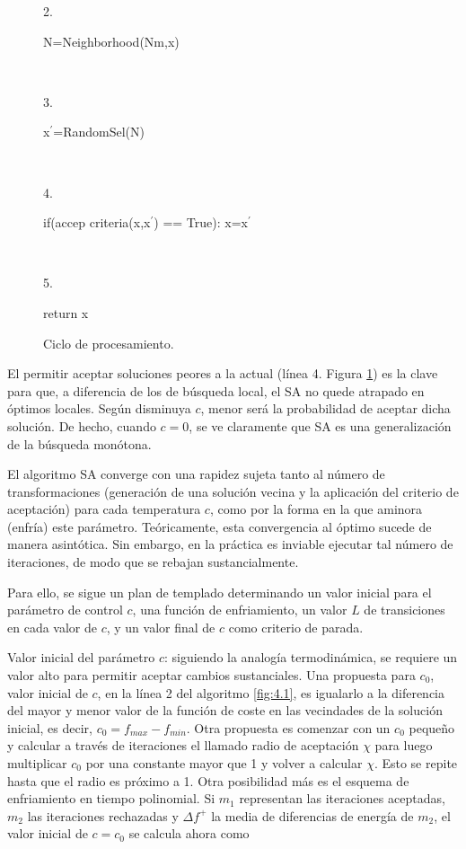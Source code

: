 \begin{figure}[ht]
\begin{minipage}[t]{0.55\textwidth}
\begin{tcolorbox}[colframe=black, colback=white, boxrule=0.5pt, width=\textwidth, sharp corners]
            \parbox[t]{0.1\linewidth}{2.} \parbox[t]{\linewidth}{\hspace{1em} N=Neighborhood(Nm,x)} \\[0.5em]
            \parbox[t]{0.1\linewidth}{3.} \parbox[t]{\linewidth}{\hspace{1em} x$^\prime$=RandomSel(N)} \\[0.5em]
            \parbox[t]{0.1\linewidth}{4.} \parbox[t]{\linewidth}{\hspace{1em} if(accep criteria(x,x$^\prime$) == True): x=x$^\prime$} \\[0.5em]
            \parbox[t]{0.1\linewidth}{5.} \parbox[t]{\linewidth}{return x}
        \end{tcolorbox}
        \caption{Ciclo de procesamiento.}
        \label{fig:4.2}
    \end{minipage}
\end{figure}

El permitir aceptar soluciones peores a la actual (línea 4. Figura \ref{fig:4.2}) es la clave para que, a diferencia de los de búsqueda local, el SA no quede atrapado en óptimos locales. Según disminuya $c$, menor será la probabilidad de aceptar dicha solución. De hecho, cuando $c = 0$, se ve claramente que SA es una generalización de la búsqueda monótona.

El algoritmo SA converge con una rapidez sujeta tanto al número de transformaciones (generación de una solución vecina y la aplicación del criterio de aceptación) para cada temperatura $c$, como por la forma en la que aminora (enfría) este parámetro.
Teóricamente, esta convergencia al óptimo sucede de manera asintótica. Sin embargo, en la práctica es inviable ejecutar tal número de iteraciones, de modo que se rebajan sustancialmente.

Para ello, se sigue un plan de templado determinando un valor inicial para el parámetro de control $c$, una función de enfriamiento, un valor $L$ de transiciones en cada valor de $c$, y un valor final de $c$ como criterio de parada.

Valor inicial del parámetro $c$: siguiendo la analogía termodinámica, se requiere un valor alto para permitir aceptar cambios sustanciales. Una propuesta para $c_0$, valor inicial de $c$, en la línea 2 del algoritmo \ref{fig:4.1}, es igualarlo a la diferencia del mayor y menor valor de la función de coste en las vecindades de la solución inicial, es decir, $c_0 = f_{max} - f_{min}$.
Otra propuesta es comenzar con un $c_0$ pequeño y calcular a través de iteraciones el llamado radio de aceptación $\chi$ para luego multiplicar $c_0$ por una constante mayor que 1 y volver a calcular $\chi$. Esto se repite hasta que el radio es próximo a 1.
Otra posibilidad más es el esquema de enfriamiento en tiempo polinomial. Si $m_1$ representan las iteraciones aceptadas, $m_2$ las iteraciones rechazadas y $\Delta f^{+}$ la media de diferencias de energía de $m_2$, el valor inicial de $c = c_0$ se calcula ahora como

